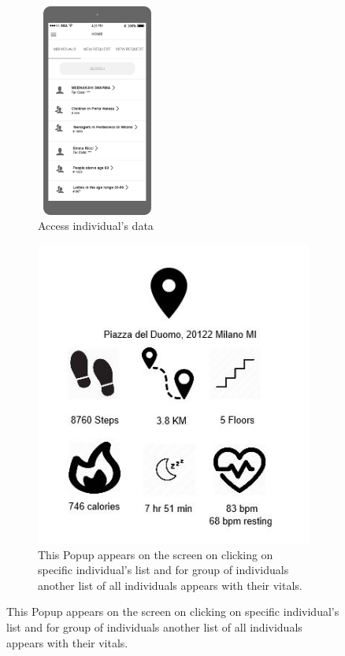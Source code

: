 \begin{figure}[H]
	\centering
	\begin{subfigure}[b]{0.4\textwidth}	
		\includegraphics[width=4cm,height=7cm]		{./Mockups/3_T-Home.png}
      	\caption{Access individual's data}
        \label{TrackMe_data}
	 \end{subfigure}
     \begin{subfigure}[b]{0.4\textwidth}	
		\includegraphics[width=\textwidth]		{./Mockups/3_T_popup.jpg}
      	\caption{This Popup appears on the screen on clicking on specific individual's list and for group of individuals another list of all individuals appears with their vitals.}
        \label{TrackMe_popup}
	 \end{subfigure}
\end{figure}


